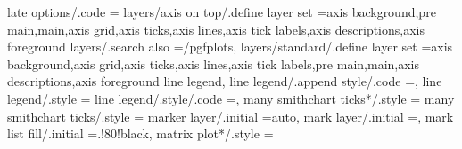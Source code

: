 {{{{{{{{{{{{{{{{{{{{{{{{{{{late options/.code                                                 ={%
layers/axis on top/.define layer set                               ={axis background,pre main,main,axis grid,axis ticks,axis lines,axis tick labels,axis descriptions,axis foreground}{                
layers/.search also                                                =/pgfplots,                                                                                                                         
layers/standard/.define layer set                                  ={axis background,axis grid,axis ticks,axis lines,axis tick labels,pre main,main,axis descriptions,axis foreground}{                
line legend,
line legend/.append style/.code                                    ={},%
line legend/.style                                                 ={%
line legend/.style/.code                                           ={},%
many smithchart ticks*/.style                                      ={                                                                                                                                  
many smithchart ticks/.style                                       ={                                                                                                                                  
marker layer/.initial                                              =auto,                                                                                                                              
mark layer/.initial                                                =,                                                                                                                                  
mark list fill/.initial                                            =.!80!black,                                                                                                                        
matrix plot*/.style                                                ={%
}}}}}}}}}}}}}}}}}}}}}}}}}}}}}}}}}}
